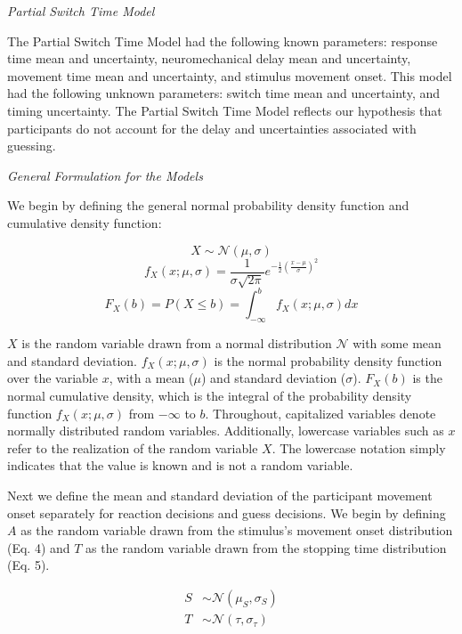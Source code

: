 \documentclass[12pt,letterpaper]{article}
\begin{document}
\noindent \emph{Partial Switch Time Model}

\noindent The Partial Switch Time Model had the following known parameters: response time mean and uncertainty, neuromechanical delay mean and uncertainty, movement time mean and uncertainty, and stimulus movement onset. This model had the following unknown parameters: switch time mean and uncertainty, and timing uncertainty. The Partial Switch Time Model reflects our hypothesis that participants do not account for the delay and uncertainties associated with guessing.

\noindent \emph{General Formulation for the Models}

\noindent We begin by defining the general normal probability density function and cumulative density function:

\begin{equation}
    X\sim\mathcal{N}(\mu,\sigma)
\end{equation}
\begin{equation}
    f_{X}(x; \mu, \sigma) = \frac{1}{\sigma\sqrt{2\pi}}e^{-\frac{1}{2}(\frac{x-\mu}{\sigma})^2}
\end{equation}
\begin{equation}
    F_{X}(b) = P(X \leq b) = \int_{-\infty}^{b} f_{X}(x; \mu, \sigma)dx
\end{equation}

$X$ is the random variable drawn from a normal distribution $\mathcal{N}$ with some mean and standard deviation. $f_{X}(x;\mu,\sigma)$ is the normal probability density function over the variable $x$, with a mean ($\mu$) and standard deviation ($\sigma$). $F_{X}(b)$ is the normal cumulative density, which is the integral of the probability density function $f_{X}(x;\mu,\sigma)$ from $-\infty$ to $b$. Throughout, capitalized variables denote normally distributed random variables. Additionally, lowercase variables such as $x$ refer to the realization of the random variable $X$. The lowercase notation simply indicates that the value is known and is not a random variable.

Next we define the mean and standard deviation of the participant movement onset separately for reaction decisions and guess decisions. We begin by defining $A$ as the random variable drawn from the stimulus’s movement onset distribution (Eq. 4) and $T$ as the random variable drawn from the stopping time distribution (Eq. 5).


\begin{align}
    S & \sim\mathcal{N}(\mu_{S},\sigma_{S}) \\
    T & \sim\mathcal{N}(\tau,\sigma_{\tau})
\end{align}
\end{document}
